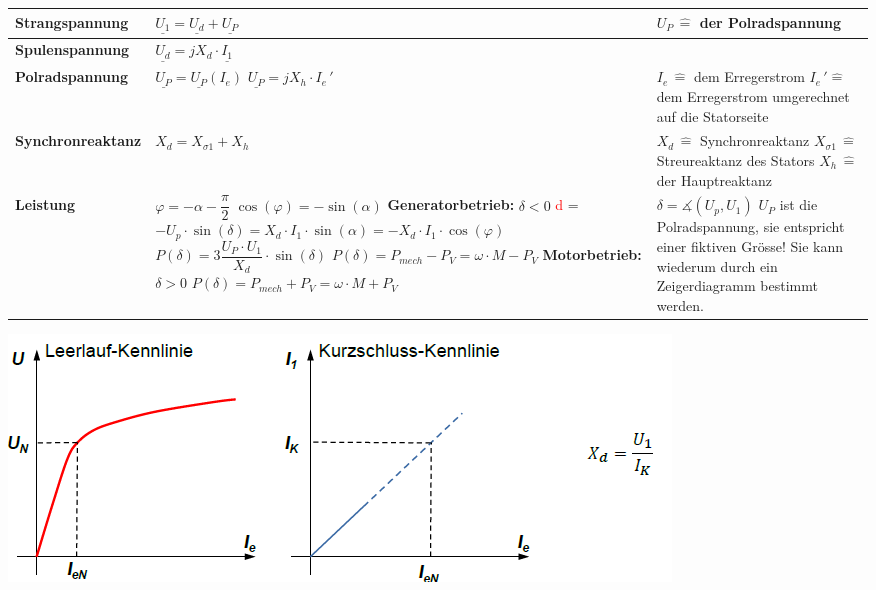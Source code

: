 \begin{tabular}[b]{| C{5cm}| P{8.5cm} | P{5 cm} |}
	\hline
\textbf{Strangspannung} 	& $\underline{U_1\!} = \underline{U_d\!} + \underline{U_P\!}$ & $U_P \, \widehat{=}$ der Polradspannung \\
	\hline
\textbf{Spulenspannung}	& $\underline{U_d} = jX_d\cdot \underline{I_1}$ & \\
	\hline
\textbf{Polradspannung} & $\underline{U_P} = \underline{U_P}\left(I_e\right)$ \newline\newline $\underline{U_P} = jX_h\cdot I_{e}\,'$  & $I_e \, \widehat{=}$ dem Erregerstrom \newline $I_e\,' \widehat{=}$ dem Erregerstrom umgerechnet auf die Statorseite \\
	\hline
\textbf{Synchronreaktanz} & $X_d = X_{\sigma 1} + X_h$ & $X_d \, \widehat{=} $ Synchronreaktanz \newline $X_{\sigma 1} \, \widehat{=}$ Streureaktanz des Stators \newline $X_h \, \widehat{=}$ der Hauptreaktanz\\
	\hline
\textbf{Leistung} \newline {} & $\varphi = -\alpha - \dfrac{\pi}{2}$ \newline $\cos(\varphi) = -\sin(\alpha)$ \newline \newline \textbf{Generatorbetrieb:} $\delta < 0$ \newline
\textcolor{red}{d} = $-U_p\cdot\sin(\delta) = X_d\cdot I_1\cdot\sin(\alpha) = -X_d\cdot I_1\cdot\cos(\varphi)$ \newline \newline $P(\delta) = 3\dfrac{U_P\cdot U_1}{X_d}\cdot\sin(\delta)$ \newline \newline $P(\delta) = P_{mech}-P_V = \omega\cdot M - P_V$ \newline \newline \textbf{Motorbetrieb:} $\delta > 0$ \newline $P(\delta) = P_{mech} + P_V = \omega\cdot M + P_V$ & $\delta =  \measuredangle (U_p, U_1)$ \newline \newline $U_P$ ist die Polradspannung, sie entspricht einer fiktiven Grösse! Sie kann wiederum durch ein Zeigerdiagramm bestimmt werden.\\
\hline
\end{tabular}
\newpage
\includegraphics[scale = 0.8]{images/KennlinieSynchronmaschine}
